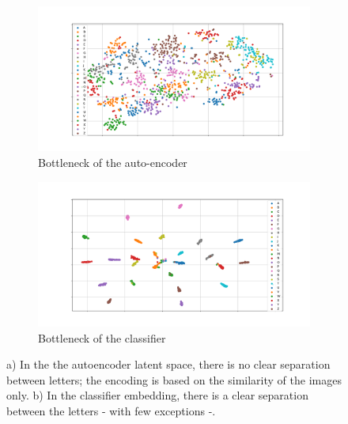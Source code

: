 \begin{figure}
    \centering
    \begin{subfigure}[b]{0.6\textwidth}
        \includegraphics[width=\textwidth]{images/gbem/AutoEnc_Vis_tsne.png}
        \caption{Bottleneck of the auto-encoder}
        \label{fig:autoenc_latent}
    \end{subfigure}
    \quad
    \begin{subfigure}[b]{0.6\textwidth}
        \includegraphics[width=\textwidth]{images/gbem/Classifier_Vis_tsne.png}
        \caption{Bottleneck of the classifier}
        \label{fig:classifier_latent}
    \end{subfigure}
    \caption{a) In the the autoencoder latent space, there is no clear separation between letters; the encoding is based on the similarity of the images only. b) In the classifier embedding, there is a clear separation between the letters - with few exceptions -.}

\end{figure}


